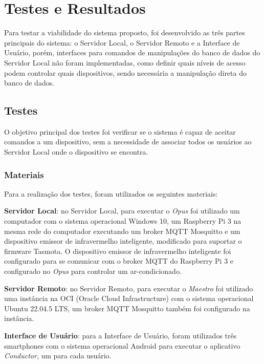 \chapter{Testes e Resultados}
\label{testes_e_resultados}

Para testar a viabilidade do sistema proposto, foi desenvolvido as três partes principais do sistema: o Servidor Local, 
o Servidor Remoto e a Interface de Usuário, porém, interfaces para comandos de manipulações do banco de dados do Servidor Local não foram
implementadas, como definir quais níveis de acesso podem controlar quais dispositivos, sendo necessária a manipulação direta do banco de dados.

\section{Testes}

O objetivo principal dos testes foi verificar se o sistema é capaz de aceitar comandos a um dispositivo, sem a necessidade de associar todos os 
usuários ao Servidor Local onde o dispositivo se encontra.

\subsection{Materiais}

Para a realização dos testes, foram utilizados os seguintes materiais:

\textbf{Servidor Local}: no Servidor Local, para executar o \emph{Opus} foi utilizado um computador com o sistema operacional Windows 10,
um Raspberry Pi 3 na mesma rede do computador executando um broker MQTT Mosquitto e um dispositivo emissor de infravermelho inteligente,
modificado para suportar o firmware Tasmota. O dispositivo emissor de infravermelho inteligente foi configurado para se comunicar com o broker
MQTT do Raspberry Pi 3 e configurado no \emph{Opus} para controlar um ar-condicionado.

\textbf{Servidor Remoto}: no Servidor Remoto, para executar o \emph{Maestro} foi utilizado uma instância na OCI (Oracle Cloud Infrastructure)
com o sistema operacional Ubuntu 22.04.5 LTS, um broker MQTT Mosquitto também foi configurado na instância.

\textbf{Interface de Usuário}: para a Interface de Usuário, foram utilizados três smartphones com o sistema operacional Android para executar
o aplicativo \emph{Conductor}, um para cada usuário.



